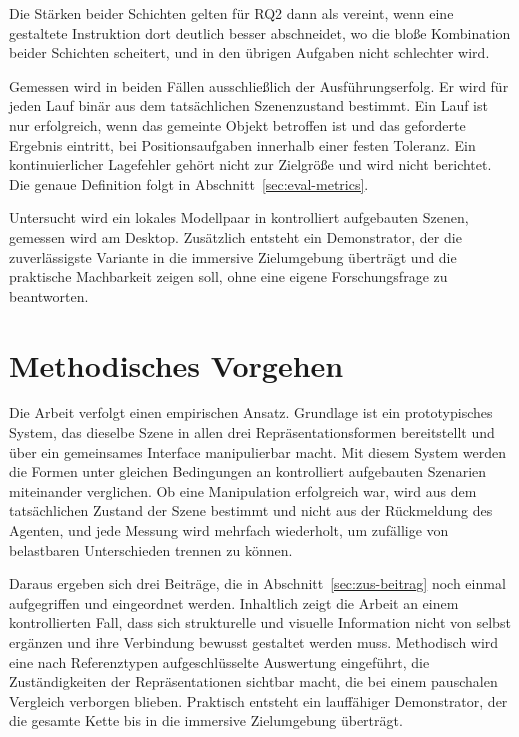 Die Stärken beider Schichten gelten für RQ2 dann als vereint, wenn eine gestaltete Instruktion dort deutlich besser abschneidet, wo die bloße Kombination beider Schichten scheitert, und in den übrigen Aufgaben nicht schlechter wird.

Gemessen wird in beiden Fällen ausschließlich der Ausführungserfolg.
Er wird für jeden Lauf binär aus dem tatsächlichen Szenenzustand bestimmt.
Ein Lauf ist nur erfolgreich, wenn das gemeinte Objekt betroffen ist und das geforderte Ergebnis eintritt, bei Positionsaufgaben innerhalb einer festen Toleranz.
Ein kontinuierlicher Lagefehler gehört nicht zur Zielgröße und wird nicht berichtet.
Die genaue Definition folgt in Abschnitt~\ref{sec:eval-metrics}.

Untersucht wird ein lokales Modellpaar in kontrolliert aufgebauten Szenen, gemessen wird am Desktop.
Zusätzlich entsteht ein Demonstrator, der die zuverlässigste Variante in die immersive Zielumgebung überträgt und die praktische Machbarkeit zeigen soll, ohne eine eigene Forschungsfrage zu beantworten.


\section{Methodisches Vorgehen}
\label{sec:ein-vorgehen}

Die Arbeit verfolgt einen empirischen Ansatz.
Grundlage ist ein prototypisches System, das dieselbe Szene in allen drei Repräsentationsformen bereitstellt und über ein gemeinsames Interface manipulierbar macht.
Mit diesem System werden die Formen unter gleichen Bedingungen an kontrolliert aufgebauten Szenarien miteinander verglichen.
Ob eine Manipulation erfolgreich war, wird aus dem tatsächlichen Zustand der Szene bestimmt und nicht aus der Rückmeldung des Agenten, und jede Messung wird mehrfach wiederholt, um zufällige von belastbaren Unterschieden trennen zu können.

Daraus ergeben sich drei Beiträge, die in Abschnitt~\ref{sec:zus-beitrag} noch einmal aufgegriffen und eingeordnet werden.
Inhaltlich zeigt die Arbeit an einem kontrollierten Fall, dass sich strukturelle und visuelle Information nicht von selbst ergänzen und ihre Verbindung bewusst gestaltet werden muss.
Methodisch wird eine nach Referenztypen aufgeschlüsselte Auswertung eingeführt, die Zuständigkeiten der Repräsentationen sichtbar macht, die bei einem pauschalen Vergleich verborgen blieben.
Praktisch entsteht ein lauffähiger Demonstrator, der die gesamte Kette bis in die immersive Zielumgebung überträgt.


